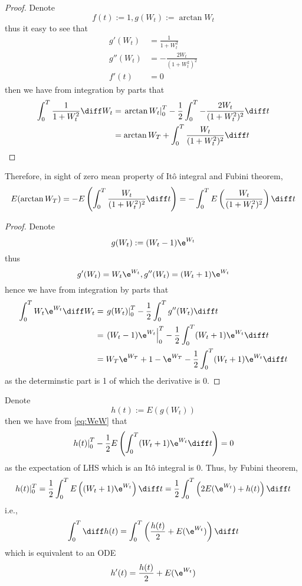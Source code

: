     \problem
    \begin{proof}
        Denote
        \[f(t):=1,g(W_t):=\arctan W_t\]
        thus it easy to see that
        \[\begin{aligned}
            g'(W_t)&=\frac{1}{1+W_t^2}\\
            g''(W_t)&=-\frac{2W_t}{(1+W_t^2)^2}\\
            f'(t)&=0
        \end{aligned}\]
        then we have from integration by parts that
        \[\begin{aligned}
            \int_0^T\frac{1}{1+W_t^2}\diff W_t
            &=\left.\arctan W_t\right|_0^T
            -\frac{1}{2}\int_0^T-\frac{2W_t}{(1+W_t^2)^2}\diff t\\
            &=\arctan W_T+\int_0^T\frac{W_t}{(1+W_t^2)^2}\diff t
        \end{aligned}\]
    \end{proof}

    Therefore, in sight of zero mean property of It\^o integral and
    Fubini theorem,
    \[E(\arctan W_T)=-E\left(\int_0^T\frac{W_t}{(1+W_t^2)^2}\diff t\right)
    =-\int_0^TE\left(\frac{W_t}{(1+W_t^2)^2}\right)\diff t\]

    \problem
    \begin{proof}
        Denote
        \[g(W_t):=(W_t-1)\e^{W_t}\]
        thus
        \[g'(W_t)=W_t\e^{W_t},g''(W_t)=(W_t+1)\e^{W_t}\]
        hence we have from integration by parts that
        \begin{equation}
            \label{eq:WeW}
            \begin{aligned}
            \int_0^TW_t\e^{W_t}\diff W_t&=
            \left.g(W_t)\right|_0^T
            -\frac{1}{2}\int_0^Tg''(W_t)\diff t\\
            &=\left.(W_t-1)\e^{W_t}\right|_0^T
            -\frac{1}{2}\int_0^T(W_t+1)\e^{W_t}\diff t\\
            &=W_T\e^{W_T}+1-\e^{W_T}
            -\frac{1}{2}\int_0^T(W_t+1)\e^{W_t}\diff t\\
            \end{aligned}
        \end{equation}
        as the determinstic part is 1 of which the derivative is 0.
    \end{proof}

    Denote
    \[h(t):=E(g(W_t))\]
    then we have from \cref{eq:WeW} that
    \[\left.h(t)\right|_0^T
    -\frac{1}{2}E\left(\int_0^T(W_t+1)\e^{W_t}\diff t\right)=0\]
    as the expectation of LHS which is an It\^o integral is 0.
    Thus, by Fubini theorem,
    \[h(t)|_0^T=\frac{1}{2}\int_0^TE\left((W_t+1)\e^{W_t}\right)\diff t
    =\frac{1}{2}\int_0^T\left(2E(\e^{W_t})+h(t)\right)\diff t\]
    i.e.,
    \[\int_0^T\diff h(t)=\int_0^T\left(\frac{h(t)}{2}
    +E(\e^{W_t})\right)\diff t\]
    which is equivalent to an ODE
    \[h'(t)=\frac{h(t)}{2}+E(\e^{W_t})\]

